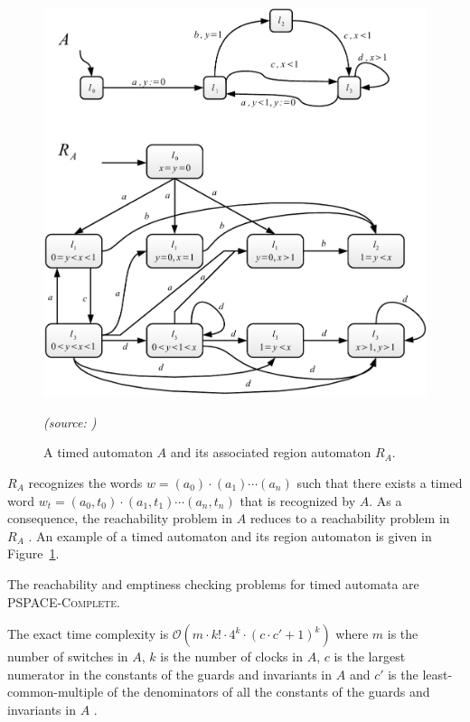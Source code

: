 \begin{figure}[htbp]
    \includegraphics[width=\textwidth]{content/timed-automata/region-automaton}
    \begin{flushright}
    	\textit{(source: \cite{RADLD94})}
    \end{flushright}
    \caption{A timed automaton $A$ and its associated region automaton $R_A$.}
    \label{fig:region-automaton}
\end{figure}

$R_A$ recognizes the words $w = (a_0) \cdot (a_1) \cdots (a_n)$ such that there exists a timed word $w_t = (a_0, t_0) \cdot (a_1, t_1) \cdots (a_n, t_n)$ that is recognized by $A$. As a consequence, the reachability problem in $A$ reduces to a reachability problem in $R_A$ \cite{RADLD94}. An example of a timed automaton and its region automaton is given in Figure~\ref{fig:region-automaton}.

\begin{theorem} \cite{RADLD94}
  
The reachability and emptiness checking problems for timed automata are \textsc{PSPACE-Complete}.

\end{theorem}

The exact time complexity is $\mathcal{O}\left(m \cdot k! \cdot 4^k \cdot (c \cdot c' + 1)^k\right)$ where $m$ is the number of switches in $A$, $k$ is the number of clocks in $A$, $c$ is the largest numerator in the constants of the guards and invariants in $A$ and $c'$ is the least-common-multiple of the denominators of all the constants of the guards and invariants in $A$ \cite{RADLD94}.

